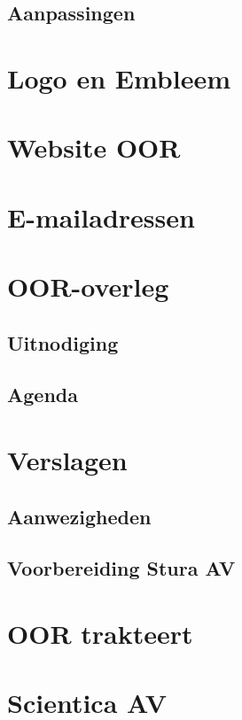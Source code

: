 \documentclass[a4paper,11pt]{article}
\begin{document}
	\subsection{Aanpassingen}
	
	\section{Logo en Embleem}
	
	\section{Website OOR}
	
	\section{E-mailadressen}
	
	\section{OOR-overleg}
	
	\subsection{Uitnodiging}
	
	\subsection{Agenda}
	
	\section{Verslagen}
	
	\subsection{Aanwezigheden}
	
	\subsection{Voorbereiding Stura AV}
	
	\section{OOR trakteert}
	
	\section{Scientica AV}
	
\end{document}
